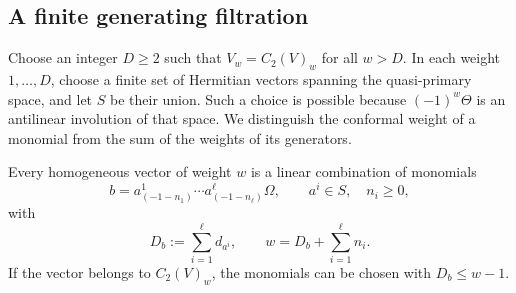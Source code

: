 \subsection{A finite generating filtration}

Choose an integer $D\geq2$ such that
$V_w=C_2(V)_w$ for all $w>D$.  In each weight $1,\ldots,D$, choose a
finite set of Hermitian vectors spanning the quasi-primary space, and
let $S$ be their union.  Such a choice is possible because
$(-1)^w\Theta$ is an antilinear involution of that space.  We distinguish
the conformal weight of a monomial from the sum of the weights of its
generators.

\begin{lemma}\label{lem:energy-filtration}
Every homogeneous vector of weight $w$ is a linear combination of
monomials
\begin{equation}\label{eq:energy-monomial}
 b=a^1_{(-1-n_1)}\cdots a^\ell_{(-1-n_\ell)}\Omega,
 \qquad a^i\in S,\quad n_i\geq0,
\end{equation}
with
\[
 D_b:=\sum_{i=1}^{\ell}d_{a^i},\qquad
 w=D_b+\sum_{i=1}^{\ell}n_i.
\]
If the vector belongs to $C_2(V)_w$, the monomials can be chosen with
$D_b\leq w-1$.
\end{lemma}

